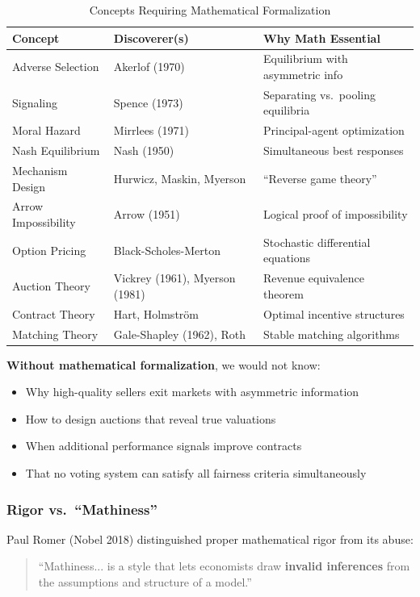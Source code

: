 \begin{table}[htbp]
\centering
\caption{Concepts Requiring Mathematical Formalization}
\label{tab:formalization-required}
\renewcommand{\arraystretch}{1.3}
\small
\begin{tabular}{@{}lll@{}}
\toprule
\textbf{Concept} & \textbf{Discoverer(s)} & \textbf{Why Math Essential} \\
\midrule
Adverse Selection & Akerlof (1970) & Equilibrium with asymmetric info \\
Signaling & Spence (1973) & Separating vs.\ pooling equilibria \\
Moral Hazard & Mirrlees (1971) & Principal-agent optimization \\
Nash Equilibrium & Nash (1950) & Simultaneous best responses \\
Mechanism Design & Hurwicz, Maskin, Myerson & ``Reverse game theory'' \\
Arrow Impossibility & Arrow (1951) & Logical proof of impossibility \\
Option Pricing & Black-Scholes-Merton & Stochastic differential equations \\
Auction Theory & Vickrey (1961), Myerson (1981) & Revenue equivalence theorem \\
Contract Theory & Hart, Holmstr\"{o}m & Optimal incentive structures \\
Matching Theory & Gale-Shapley (1962), Roth & Stable matching algorithms \\
\bottomrule
\end{tabular}
\end{table}

\textbf{Without mathematical formalization}, we would not know:
\begin{itemize}[nosep]
    \item Why high-quality sellers exit markets with asymmetric information
    \item How to design auctions that reveal true valuations
    \item When additional performance signals improve contracts
    \item That no voting system can satisfy all fairness criteria simultaneously
\end{itemize}

\subsubsection{Rigor vs.\ ``Mathiness''}

Paul Romer (Nobel 2018) distinguished proper mathematical rigor from its abuse:
\begin{quote}
``Mathiness... is a style that lets economists draw \textbf{invalid inferences} from
the assumptions and structure of a model.'' \citep{romer2015mathiness}
\end{quote}

